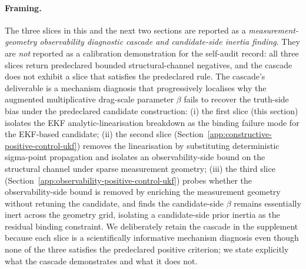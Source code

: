 \documentclass{article}
\begin{document}
\paragraph{Framing.}
The three slices in this and the next two sections are reported as a \emph{measurement-geometry observability diagnostic cascade and candidate-side inertia finding}. They are \emph{not} reported as a calibration demonstration for the self-audit record: all three slices return predeclared bounded structural-channel negatives, and the cascade does not exhibit a slice that satisfies the predeclared rule. The cascade's deliverable is a mechanism diagnosis that progressively localises why the augmented multiplicative drag-scale parameter $\beta$ fails to recover the truth-side bias under the predeclared candidate construction: (i) the first slice (this section) isolates the EKF analytic-linearisation breakdown as the binding failure mode for the EKF-based candidate; (ii) the second slice (Section~\ref{app:constructive-positive-control-ukf}) removes the linearisation by substituting deterministic sigma-point propagation and isolates an observability-side bound on the structural channel under sparse measurement geometry; (iii) the third slice (Section~\ref{app:observability-positive-control-ukf}) probes whether the observability-side bound is removed by enriching the measurement geometry without retuning the candidate, and finds the candidate-side $\beta$ remains essentially inert across the geometry grid, isolating a candidate-side prior inertia as the residual binding constraint. We deliberately retain the cascade in the supplement because each slice is a scientifically informative mechanism diagnosis even though none of the three satisfies the predeclared positive criterion; we state explicitly what the cascade demonstrates and what it does not.
\end{document}
